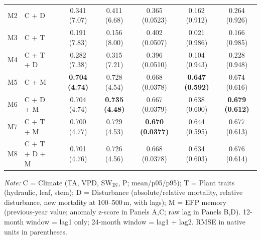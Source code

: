 \begin{table}[htbp]
\begin{tabular}{llcccccc}
M2 & C + D &  & 0.341 (7.07) & 0.411 (6.68) & 0.365 (0.0523) & 0.162 (0.912) & 0.264 (0.926) \\
M3 & C + T &  & 0.191 (7.83) & 0.156 (8.00) & 0.402 (0.0507) & 0.021 (0.986) & 0.166 (0.985) \\
M4 & C + T + D &  & 0.282 (7.38) & 0.315 (7.21) & 0.396 (0.0510) & 0.104 (0.943) & 0.228 (0.948) \\
M5 & C + M &  & \textbf{0.704 (4.74)} & 0.728 (4.54) & 0.668 (0.0378) & \textbf{0.647 (0.592)} & 0.674 (0.616) \\
M6 & C + D + M &  & 0.704 (4.74) & \textbf{0.735 (4.48)} & 0.667 (0.0379) & 0.638 (0.600) & \textbf{0.679 (0.612)} \\
M7 & C + T + M &  & 0.700 (4.77) & 0.729 (4.53) & \textbf{0.670 (0.0377)} & 0.644 (0.595) & 0.677 (0.613) \\
M8 & C + T + D + M &  & 0.701 (4.76) & 0.726 (4.56) & 0.668 (0.0378) & 0.634 (0.603) & 0.676 (0.614) \\
\midrule
\bottomrule
\end{tabular}
\vspace{2pt}
\begin{minipage}{\linewidth}
\footnotesize
\textit{Note:} C = Climate (TA, VPD, SW$_\mathrm{IN}$, P; mean/p05/p95); T = Plant traits (hydraulic, leaf, stem); D = Disturbance (absolute/relative mortality, relative disturbance, new mortality at 100--500\,m, with lags); M = EFP memory (previous-year value; anomaly z-score in Panels A,C; raw lag in Panels B,D). 12-month window = lag1 only; 24-month window = lag1 + lag2. RMSE in native units in parentheses.
\end{minipage}
\end{table}

